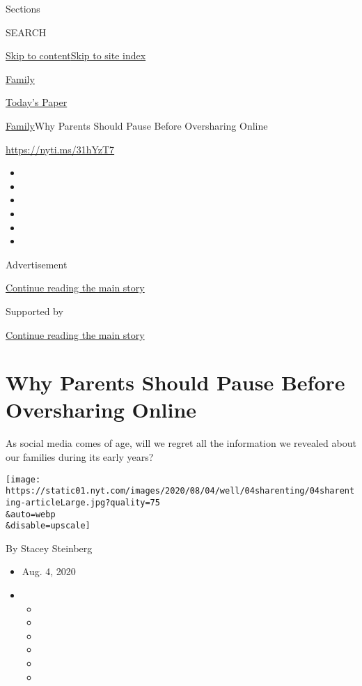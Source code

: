 Sections

SEARCH

\protect\hyperlink{site-content}{Skip to
content}\protect\hyperlink{site-index}{Skip to site index}

\href{https://www.nytimes.com/section/well/family}{Family}

\href{https://myaccount.nytimes.com/auth/login?response_type=cookie\&client_id=vi}{}

\href{https://www.nytimes.com/section/todayspaper}{Today's Paper}

\href{/section/well/family}{Family}\textbar{}Why Parents Should Pause
Before Oversharing Online

\href{https://nyti.ms/31hYzT7}{https://nyti.ms/31hYzT7}

\begin{itemize}
\item
\item
\item
\item
\item
\item
\end{itemize}

Advertisement

\protect\hyperlink{after-top}{Continue reading the main story}

Supported by

\protect\hyperlink{after-sponsor}{Continue reading the main story}

\hypertarget{why-parents-should-pause-before-oversharing-online}{%
\section{Why Parents Should Pause Before Oversharing
Online}\label{why-parents-should-pause-before-oversharing-online}}

As social media comes of age, will we regret all the information we
revealed about our families during its early years?

\texttt{[image: https://static01.nyt.com/images/2020/08/04/well/04sharenting/04sharenting-articleLarge.jpg?quality=75\\\&auto=webp\\\&disable=upscale]}

By Stacey Steinberg

\begin{itemize}
\item
  Aug. 4, 2020
\item
  \begin{itemize}
  \item
  \item
  \item
  \item
  \item
  \item
  \end{itemize}
\end{itemize}

